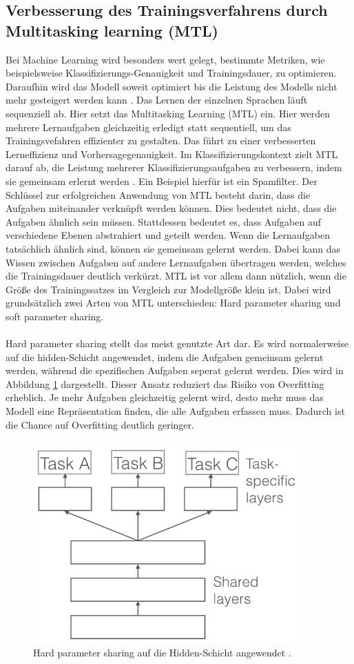 \subsection{Verbesserung des Trainingsverfahrens durch Multitasking learning (MTL)}
 Bei Machine Learning wird besonders wert gelegt, bestimmte Metriken, wie beispielsweise Klassifizierungs-Genauigkeit und Trainingsdauer, zu optimieren. Daraufhin wird das Modell soweit optimiert bis die Leistung des Modells nicht mehr gesteigert werden kann \cite{Ruder.2017}. Das Lernen  der einzelnen Sprachen läuft sequenziell ab. Hier setzt das Multitasking Learning (MTL) ein.  Hier werden mehrere Lernaufgaben gleichzeitig erledigt statt sequentiell, um das Trainingsvefahren effizienter zu gestalten. Das führt zu einer verbesserten Lerneffizienz und Vorhersagegenauigkeit. Im Klassifizierungskontext zielt MTL darauf ab, die Leistung mehrerer Klassifizierungsaufgaben zu verbessern, indem sie gemeinsam erlernt werden \cite{Lu_multitasklearning}. Ein Beispiel hierfür ist ein Spamfilter. Der Schlüssel zur erfolgreichen Anwendung von MTL besteht darin, dass die Aufgaben miteinander verknüpft werden können. Dies bedeutet nicht, dass die Aufgaben ähnlich sein müssen. Stattdessen bedeutet es, dass Aufgaben auf verschiedene Ebenen abstrahiert und geteilt werden. Wenn die Lernaufgaben tatsächlich ähnlich sind, können sie gemeinsam gelernt werden. Dabei kann das Wissen zwischen Aufgaben auf andere Lernaufgaben übertragen werden, welches die Trainingsdauer deutlich verkürzt. MTL ist vor allem dann nützlich, wenn die Größe des Trainingssatzes im Vergleich zur Modellgröße klein ist. Dabei wird grundsätzlich zwei Arten von MTL unterschieden: Hard parameter sharing und soft parameter sharing. \\ \\ Hard parameter sharing stellt das meist genutzte Art dar\cite{Ruder.2017}. Es wird normalerweise auf die hidden-Schicht angewendet, indem die Aufgaben gemeinsam gelernt werden, während die spezifischen Aufgaben seperat gelernt werden. Dies wird in Abbildung \ref{fig:hard} dargestellt. Dieser Ansatz reduziert das Risiko von Overfitting erheblich. Je mehr Aufgaben gleichzeitig gelernt wird, desto mehr muss das Modell eine Repräsentation finden, die alle Aufgaben erfassen muss. Dadurch ist die Chance auf Overfitting deutlich geringer.
  \begin{figure}[h!]
 	\centering
 	\includegraphics[width=0.8\linewidth]{images/hard}
 	\caption{Hard parameter sharing auf die Hidden-Schicht angewendet \cite{Kulbear.2017}.} %
 	\label{fig:hard}
 \end{figure}

